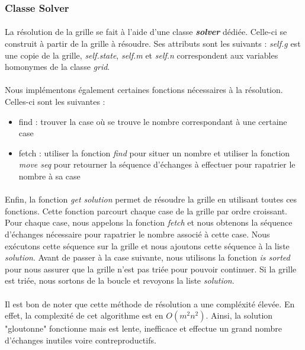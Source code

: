 \documentclass[12pt]{article}
\begin{document}
\subsubsection{Classe Solver}

\paragraph{}
La résolution de la grille se fait à l'aide d'une classe \textbf{\textit{solver}} dédiée. Celle-ci se construit à partir de la grille à résoudre. Ses attributs sont les suivants : \textit{self.g} est une copie de la grille, \textit{self.state}, \textit{self.m} et \textit{self.n} correspondent aux variables homonymes de la classe \textit{grid}.

\paragraph{}
Nous implémentons également certaines fonctions nécessaires à la résolution.
Celles-ci sont les suivantes :
\begin{itemize}
    \item find : trouver la case où se trouve le nombre correspondant à une certaine case
    \item fetch : utiliser la fonction \textit{find} pour situer un nombre et utiliser la fonction \textit{move seq} pour retourner la séquence d'échanges à effectuer pour rapatrier le nombre à sa case
\end{itemize}
\paragraph{}
Enfin, la fonction \textit{get solution} permet de résoudre la grille en utilisant toutes ces fonctions. Cette fonction parcourt chaque case de la grille par ordre croissant. Pour chaque case, nous appelons la fonction \textit{fetch} et nous obtenons la séquence d'échanges nécessaire pour rapatrier le nombre associé à cette case. Nous exécutons cette séquence sur la grille et nous ajoutons cette séquence à la liste \textit{solution}. Avant de passer à la case suivante, nous utilisons la fonction \textit{is sorted} pour nous assurer que la grille n'est pas triée pour pouvoir continuer. Si la grille est triée, nous sortons de la boucle et revoyons la liste \textit{solution}. 

\paragraph{}
Il est bon de noter que cette méthode de résolution a une compléxité élevée. En effet, la complexité de cet algorithme est en $O(m^2n^2).$
Ainsi, la solution "gloutonne" fonctionne mais est lente, inefficace et effectue un grand nombre d'échanges inutiles voire contreproductifs.
\end{document}
